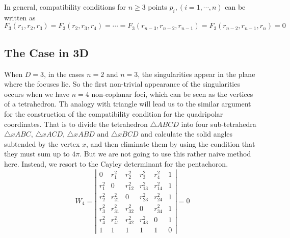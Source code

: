 \documentclass{article}
\begin{document}
In general, compatibility conditions for $n \ge 3$ points $p_i, (i=1,\cdots,n)$ can be written as
\begin{equation}
\label{}
F_3(r_1,r_2,r_3) =  F_3(r_2,r_3,r_4) = \cdots = F_3(r_{n-3},r_{n-2},r_{n-1})= F_3(r_{n-2},r_{n-1},r_{n})=0
\end{equation}

\subsection{The Case in 3D}
\label{sec-1-5}
 When $D=3$, in the cases $n=2$ and $n=3$, the singularities appear in the plane where the focuses lie. 
So the first non-trivial appearance of the singularities occurs when we have $n=4$ non-coplanar foci, which can be seen as the vertices of a tetrahedron. 
Th analogy with triangle will lead us to the similar argument for the construction of the compatibility condition for the quadripolar coordinates. 
That is to divide the tetrahedron $\triangle ABCD$ into four sub-tetrahedra $\triangle xABC$, $\triangle xACD$, $\triangle xABD$ and $\triangle xBCD$ and calculate the solid angles subtended by the vertex $x$, and then eliminate them by using the condition that they must sum up to $4\pi$. 
But we are not going to use this rather naive method here. Instead, we resort to the Cayley determinant for the pentachoron.
\begin{equation}
\label{eq:vol_det}
W_4=
\left|\begin{array}{cccccc}
0 & r_{1}^2 & r_{2}^2 & r_{3}^2 & r_{4}^2 & 1 \\
r_{1}^2 & 0 & r_{12}^2 & r_{13}^2 & r_{14}^2 & 1 \\
r_{2}^2 & r_{21}^2 & 0 & r_{23}^2 & r_{24}^2 & 1 \\
r_{3}^2 & r_{31}^2 & r_{32}^2 & 0 & r_{34}^2 & 1 \\
r_{4}^2 & r_{41}^2 & r_{42}^2 & r_{43}^2 & 0 & 1 \\
1 & 1 & 1 & 1 & 1 & 0  
\end{array}\right|
=0
\end{equation}
\end{document}
